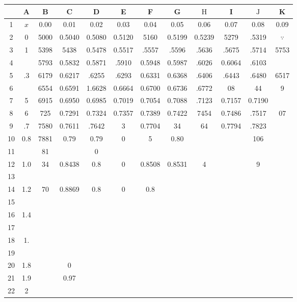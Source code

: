 \documentclass[10pt]{article}
\begin{document}
\begin{CJK*}{UTF8}{bsmi}
\begin{center}
\begin{tabular}{|c|c|c|c|c|c|c|c|c|c|c|c|}
\hline
 & A & B & C & D & E & F & G & $\mathrm{H}$ & I & $\mathrm{J}$ & K \\
\hline
1 & $x$ & 0.00 & 0.01 & 0.02 & 0.03 & 0.04 & 0.05 & 0.06 & 0.07 & 0.08 & 0.09 \\
\hline
2 & 0 & 5000 & 0.5040 & 0.5080 & 0.5120 & 5160 & 0.5199 & 0.5239 & 5279 & .5319 & $\because$ \\
\hline
3 & 1 & 5398 & 5438 & 0.5478 & 0.5517 & .5557 & .5596 & .5636 & .5675 & .5714 & 5753 \\
\hline
4 &  & 5793 & 0.5832 & 0.5871 & .5910 & 0.5948 & 0.5987 & .6026 & 0.6064 & .6103 &  \\
\hline
5 & .3 & 6179 & 0.6217 & .6255 & .6293 & 0.6331 & 0.6368 & .6406 & .6443 & .6480 & 6517 \\
\hline
6 &  & 6554 & 0.6591 & 1.6628 & 0.6664 & 0.6700 & 0.6736 & .6772 & 08 & 44 & 9 \\
\hline
7 & 5 & 6915 & 0.6950 & 0.6985 & 0.7019 & 0.7054 & 0.7088 & .7123 & 0.7157 & 0.7190 &  \\
\hline
8 & 6 & 725 & 0.7291 & 0.7324 & 0.7357 & 0.7389 & 0.7422 & 7454 & 0.7486 & .7517 & 07 \\
\hline
9 & .7 & 7580 & 0.7611 & .7642 & 3 & 0.7704 & 34 & 64 & 0.7794 & .7823 &  \\
\hline
10 & 0.8 & 7881 & 0.79 & 0.79 & 0 & 5 & 0.80 &  &  & 106 &  \\
\hline
11 &  & 81 &  & 0 &  &  &  &  &  &  &  \\
\hline
12 & 1.0 & 34 & 0.8438 & 0.8 & 0 & 0.8508 & 0.8531 & 4 &  & 9 &  \\
\hline
13 &  &  &  &  &  &  &  &  &  &  &  \\
\hline
14 & 1.2 & 70 & 0.8869 & 0.8 & 0 & 0.8 &  &  &  &  &  \\
\hline
15 &  &  &  &  &  &  &  &  &  &  &  \\
\hline
16 & 1.4 &  &  &  &  &  &  &  &  &  &  \\
\hline
17 &  &  &  &  &  &  &  &  &  &  &  \\
\hline
18 & 1. &  &  &  &  &  &  &  &  &  &  \\
\hline
19 &  &  &  &  &  &  &  &  &  &  &  \\
\hline
20 & 1.8 &  & 0 &  &  &  &  &  &  &  &  \\
\hline
21 & 1.9 &  & 0.97 &  &  &  &  &  &  &  &  \\
\hline
22 & 2 &  &  &  &  &  &  &  &  &  &  \\

\end{tabular}
\end{center}
\end{CJK*}
\end{document}
